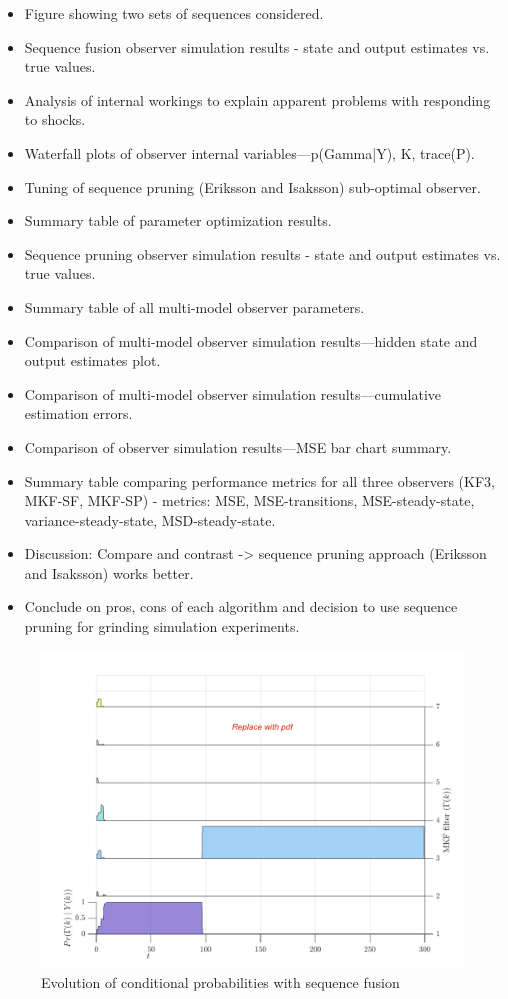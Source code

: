 \begin{itemize}
	\item Figure showing two sets of sequences considered.
	\item Sequence fusion observer simulation results - state and output estimates vs. true values.
	\item Analysis of internal workings to explain apparent problems with responding to shocks.
	\item Waterfall plots of observer internal variables—p(Gamma|Y), K, trace(P).
	\item Tuning of sequence pruning (Eriksson and Isaksson) sub-optimal observer.
	\item Summary table of parameter optimization results.
	\item Sequence pruning observer simulation results - state and output estimates vs. true values.
	\item Summary table of all multi-model observer parameters.
	\item Comparison of multi-model observer simulation results—hidden state and output estimates plot.
	\item Comparison of multi-model observer simulation results—cumulative estimation errors.
	\item Comparison of observer simulation results—MSE bar chart summary.
	\item Summary table comparing performance metrics for all three observers (KF3, MKF-SF, MKF-SP) - metrics: MSE, MSE-transitions, MSE-steady-state, variance-steady-state, MSD-steady-state.
	\item Discussion: Compare and contrast -> sequence pruning approach (Eriksson and Isaksson) works better.
	\item Conclude on pros, cons of each algorithm and decision to use sequence pruning for grinding simulation experiments.
\end{itemize}

\begin{figure}[htp]
	\centering
	\includegraphics[width=15cm]{images/rod-obs-sim-1-4-wfplot-DRAFT.png}
	\caption{Evolution of conditional probabilities with sequence fusion}
	\label{fig:rod-obs-sim-1-4-wfplot}
\end{figure}

